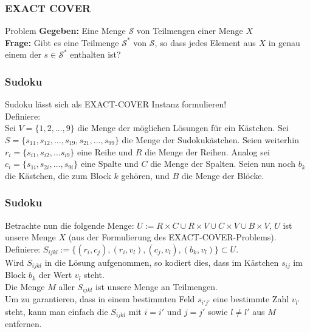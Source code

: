 \begin{frame}
\frametitle{EXACT COVER}
\begin{block}{Problem}
\textbf{Gegeben:} Eine Menge $\mathcal{S}$ von Teilmengen einer Menge $X$\\
\textbf{Frage:} Gibt es eine Teilmenge $\mathcal{S}^*$ von $\mathcal{S}$, so dass jedes Element aus $X$ in genau einem der $s \in \mathcal{S}^*$ enthalten ist?
\end{block}
\end{frame}

\begin{frame}
\frametitle{Sudoku}
Sudoku lässt sich als EXACT-COVER Instanz formulieren!\\
Definiere:\\
Sei $V = \{1,2,\ldots,9\}$ die Menge der möglichen Lösungen für ein Kästchen.
Sei $S = \{s_{11}, s_{12},\ldots,s_{19},s_{21},\ldots,s_{99}\}$ die Menge der Sudokukästchen.
Seien weiterhin $r_i = \{s_{i1}, s_{i2}, \ldots s_{i9}\}$ eine Reihe und $R$ die Menge der Reihen.
Analog sei $c_i = \{s_{1i}, s_{2i}, \ldots, s_{9i}\}$ eine Spalte und $C$ die Menge der Spalten.
Seien nun noch $b_k$ die Kästchen, die zum Block $k$ gehören, und $B$ die Menge der Blöcke.
\end{frame}

\begin{frame}
\frametitle{Sudoku}
Betrachte nun die folgende Menge: $U := R \times C \cup R \times V \cup C \times V \cup B \times V$, $U$ ist unsere Menge $X$ (aus der Formulierung des EXACT-COVER-Problems).\\
Definiere: $S_{ijkl} := \{(r_i,c_j),(r_i,v_l),(c_j,v_l),(b_k,v_l)\} \subset U$.\\[8pt]
Wird $S_{ijkl}$ in die Lösung aufgenommen, so kodiert dies, dass im Kästchen $s_{ij}$ im Block $b_k$ der Wert $v_l$ steht.\\
Die Menge $M$ aller $S_{ijkl}$ ist unsere Menge an Teilmengen.\\
Um zu garantieren, dass in einem bestimmten Feld $s_{i'j'}$ eine bestimmte Zahl $v_{l'}$ steht, kann man einfach die $S_{ijkl}$ mit $i = i'$ und $j = j'$ sowie $l \neq l'$ aus $M$ entfernen.
\end{frame}

